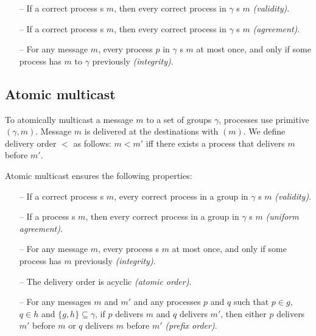 \begin{itemize}

    \item[--] If a correct process \rmcast{}s $m$, then every correct
      process in $\gamma$ \rmdel{}s $m$ \emph{(validity)}.
    
    \item[--] If a correct process \rmdel{}s $m$, then every correct
      process in $\gamma$ \rmdel{}s $m$ \emph{(agreement)}.
    
    \item[--] For any message $m$, every process $p$ in $\gamma$
      \rmdel{}s $m$ at most once, and only if some process has
      \rmcast{} $m$ to $\gamma$ previously \emph{(integrity)}.
    
\end{itemize}

\subsection{Atomic multicast}
\label{sec:amcast}

To atomically multicast a message $m$ to a set of groups $\gamma$,
processes use primitive \amcast$(\gamma, m)$.  Message $m$ is
delivered at the destinations with \amdel$(m)$.  We define delivery
order $<$ as follows: $m < m'$ iff there exists a process that
delivers $m$ before $m'$.

Atomic multicast ensures the following properties:

\begin{itemize}
    
    \item[--] If a correct process \amcast{}s $m$, every correct
      process in a group in $\gamma$ \amdel{}s $m$ \emph{(validity)}.
    
    \item[--] If a process \amdel{}s $m$, then every correct process
      in a group in $\gamma$ \amdel{}s $m$ \emph{(uniform agreement)}.
    
    \item[--] For any message $m$, every process \amdel{}s $m$ at most
      once, and only if some process has \amcast{} $m$ previously
      \emph{(integrity)}.
    
    \item[--] The delivery order is acyclic \emph{(atomic order)}.

    \item[--] For any messages $m$ and $m'$ and any processes $p$ and
      $q$ such that $p \in g$, $q \in h$ and $\{ g, h \} \subseteq
      \gamma$, if $p$ delivers $m$ and $q$ delivers $m'$, then either
      $p$ delivers $m'$ before $m$ or $q$ delivers $m$ before $m'$
      \emph{(prefix order)}.
    
\end{itemize}

